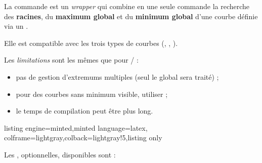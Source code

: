 \documentclass[11pt,a4paper]{ltxdoc}
\begin{document}
La commande  est un \textit{wrapper} qui combine en une seule commande la recherche des \textbf{racines}, du \textbf{maximum global} et du \textbf{minimum global} d'une courbe définie via un .

\smallskip

Elle est compatible avec les trois types de courbes (, , ).

\smallskip

{\small\faBomb} Les \textit{limitations} sont les mêmes que pour / :

\begin{itemize}
  \item pas de gestion d'extremums multiples (seul le global sera traité) ;
  \item pour des courbes sans minimum visible, utiliser  ;
  \item le temps de compilation peut être plus long.
\end{itemize}

\begin{tcblisting}{listing engine=minted,minted language=latex,
    colframe=lightgray,colback=lightgray!5,listing only}
\end{tcblisting}

Les \MontreCode{[clés]}, optionnelles, disponibles sont :
\end{document}
